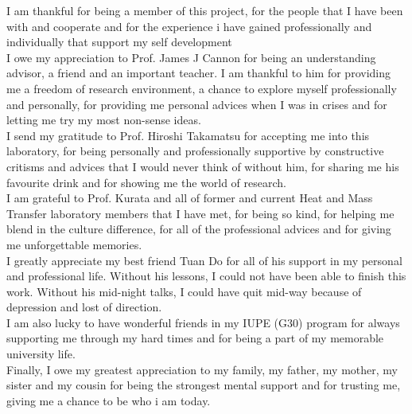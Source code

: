 \thispagestyle{plain}
I am thankful for being a member of this project, for
the people that I have been with and cooperate and 
for the experience i have gained professionally and individually that support my self development
\\
I owe my appreciation to Prof. James J Cannon for being an understanding advisor, 
a friend and an important teacher. I am thankful to him for providing me a 
freedom of research environment, a chance to explore myself professionally and 
personally, for providing me personal advices when I was in crises and for 
letting me try my most non-sense ideas.\\
I send my gratitude to Prof. Hiroshi Takamatsu for accepting me into this 
laboratory, for being personally and professionally supportive by 
constructive critisms and advices that I would never think of without him,
for sharing me his favourite drink and for showing me the world of research.\\
I am grateful to Prof. Kurata and all of former and current Heat and Mass Transfer
laboratory members that I have met, for being so kind, for helping me blend in 
the culture difference, for all of the professional advices and for giving me 
unforgettable memories.\\
I greatly appreciate my best friend Tuan Do for all of his support in my 
personal and professional life. Without his lessons, I could not have been 
able to finish this work. Without his mid-night talks, I could have quit 
mid-way because of depression and lost of direction.\\
I am also lucky to have wonderful friends in my IUPE (G30) program for always 
supporting me through my hard times and for being a part of my memorable 
university life.\\
Finally, I owe my greatest appreciation to my family, my father, my mother,
my sister and my cousin for being the 
strongest mental support and for trusting me, giving me a chance to be who 
i am today.